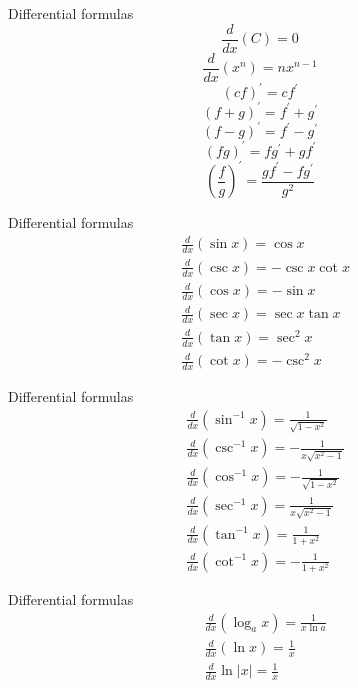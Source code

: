 \begin{frame}{Differential formulas}
    $$
        \frac{d}{d x}(C)=0
    $$$$
        \frac{d}{d x}(x^{n})=n x^{n-1}
    $$$$
        (c f)^{\prime}=c f^{\prime}
    $$$$
        (f+g)^{\prime}=f^{\prime}+g^{\prime}
    $$$$
        (f-g)^{\prime}=f^{\prime}-g^{\prime}
    $$$$
        (f g)^{\prime}=f g^{\prime}+g f^{\prime}
    $$$$
        (\frac{f}{g})^{\prime}=\frac{g f^{\prime}-f g^{\prime}}{g^{2}}
    $$
\end{frame}



\begin{frame}{Differential formulas}
    $$
        \begin{aligned}
             & \frac{d}{d x}(\sin x)=\cos x         \\
             & \frac{d}{d x}(\csc x)=-\csc x \cot x \\
             & \frac{d}{d x}(\cos x)=-\sin x        \\
             & \frac{d}{d x}(\sec x)=\sec x \tan x  \\
             & \frac{d}{d x}(\tan x)=\sec ^{2} x    \\
             & \frac{d}{d x}(\cot x)=-\csc ^{2} x
        \end{aligned}
    $$
\end{frame}



\begin{frame}{Differential formulas}
    $$
        \begin{aligned}
             & \frac{d}{d x}\left(\sin ^{-1} x\right)=\frac{1}{\sqrt{1-x^{2}}}    \\
             & \frac{d}{d x}\left(\csc ^{-1} x\right)=-\frac{1}{x \sqrt{x^{2}-1}} \\
             & \frac{d}{d x}\left(\cos ^{-1} x\right)=-\frac{1}{\sqrt{1-x^{2}}}   \\
             & \frac{d}{d x}\left(\sec ^{-1} x\right)=\frac{1}{x \sqrt{x^{2}-1}}  \\
             & \frac{d}{d x}\left(\tan ^{-1} x\right)=\frac{1}{1+x^{2}}           \\
             & \frac{d}{d x}\left(\cot ^{-1} x\right)=-\frac{1}{1+x^{2}}
        \end{aligned}
    $$
\end{frame}



\begin{frame}{Differential formulas}
    $$
        \begin{aligned}
             & \frac{d}{d x}\left(\log _{a} x\right)=\frac{1}{x \ln a} \\
             & \frac{d}{d x}(\ln x)=\frac{1}{x}                        \\
             & \frac{d}{d x} \ln |x|=\frac{1}{x}                       \\
        \end{aligned}
    $$
\end{frame}



